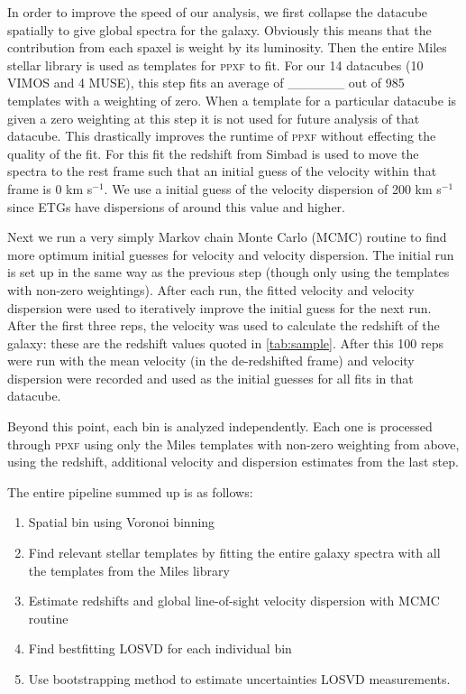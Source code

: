 	In order to improve the speed of our analysis, we first collapse the datacube spatially to give global spectra for the galaxy. Obviously this means that the contribution from each spaxel is weight by its luminosity. Then the entire Miles stellar library \citep{} is used as templates for \textsc{ppxf} to fit. For our 14 datacubes (10 VIMOS and 4 MUSE), this step fits an average of \_\_\_\_\_\_ out of 985 templates with a weighting of zero. When a template for a particular datacube is given a zero weighting at this step it is not used for future analysis of that datacube. This drastically improves the runtime of \textsc{ppxf} without effecting the quality of the fit. For this fit the redshift from Simbad is used to move the spectra to the rest frame such that an initial guess of the velocity within that frame is 0 km s$^{-1}$. We use a initial guess of the velocity dispersion of 200 km s$^{-1}$ since ETGs have dispersions of around this value and higher. 

	Next we run a very simply Markov chain Monte Carlo (MCMC) routine to find more optimum initial guesses for velocity and velocity dispersion. The initial run is set up in the same way as the previous step (though only using the templates with non-zero weightings). After each run, the fitted velocity and velocity dispersion were used to iteratively improve the initial guess for the next run. After the first three reps, the velocity was used to calculate the redshift of the galaxy: these are the redshift values quoted in \ref{tab:sample}. After this 100 reps were run with the mean velocity (in the de-redshifted frame) and velocity dispersion were recorded and used as the initial guesses for all fits in that datacube. 

	Beyond this point, each bin is analyzed independently. Each one is processed through \textsc{ppxf} using only the Miles templates with non-zero weighting from above, using the redshift, additional velocity and dispersion estimates from the last step. 







	The entire pipeline summed up is as follows:
	\begin{enumerate}
		\item Spatial bin using Voronoi binning
		\item Find relevant stellar templates by fitting the entire galaxy spectra with all the templates from the Miles library
		\item Estimate redshifts and global line-of-sight velocity dispersion with MCMC routine 
		\item Find bestfitting LOSVD for each individual bin
		\item Use bootstrapping method to estimate uncertainties LOSVD measurements. 
	\end{enumerate}


